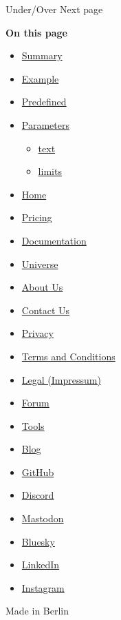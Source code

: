 { Under/Over } { Next page }

\textbf{On this page}

\begin{itemize}
\tightlist
\item
  \hyperref[summary]{Summary}
\item
  \hyperref[example]{Example}
\item
  \hyperref[predefined]{Predefined}
\item
  \hyperref[parameters]{Parameters}

  \begin{itemize}
  \tightlist
  \item
    \hyperref[parameters-text]{text}
  \item
    \hyperref[parameters-limits]{limits}
  \end{itemize}
\end{itemize}

\begin{itemize}
\tightlist
\item
  \href{/}{Home}
\item
  \href{/pricing/}{Pricing}
\item
  \href{/docs/}{Documentation}
\item
  \href{/universe/}{Universe}
\item
  \href{/about/}{About Us}
\item
  \href{/contact/}{Contact Us}
\item
  \href{/privacy/}{Privacy}
\item
  \href{https://typst.app/terms}{Terms and Conditions}
\item
  \href{/legal/}{Legal (Impressum)}
\end{itemize}

\begin{itemize}
\tightlist
\item
  \href{https://forum.typst.app}{Forum}
\item
  \href{/tools/}{Tools}
\item
  \href{/blog/}{Blog}
\item
  \href{https://github.com/typst/}{GitHub}
\item
  \href{https://discord.gg/2uDybryKPe}{Discord}
\item
  \href{https://mastodon.social/@typst}{Mastodon}
\item
  \href{https://bsky.app/profile/typst.app}{Bluesky}
\item
  \href{https://www.linkedin.com/company/typst/}{LinkedIn}
\item
  \href{https://instagram.com/typstapp/}{Instagram}
\end{itemize}

Made in Berlin

